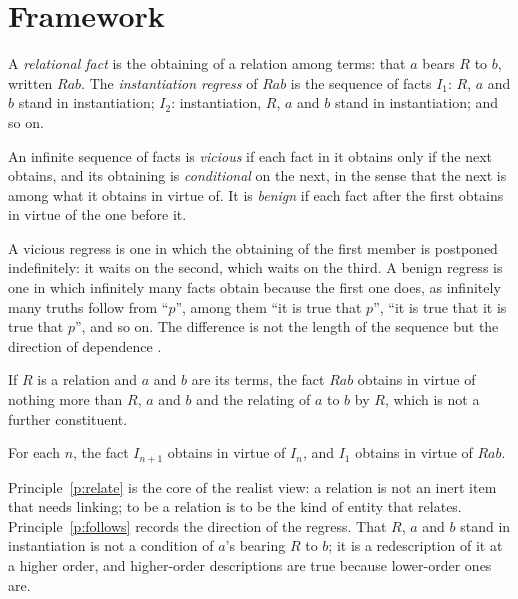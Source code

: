 \documentclass{situationist-preprint}
\begin{document}
\section{Framework}

\begin{definition}\label{d:fact}
A \emph{relational fact} is the obtaining of a relation among terms: that $a$ bears $R$ to $b$, written $Rab$. The \emph{instantiation regress} of $Rab$ is the sequence of facts $I_1$: $R$, $a$ and $b$ stand in instantiation; $I_2$: instantiation, $R$, $a$ and $b$ stand in instantiation; and so on.
\end{definition}

\begin{definition}\label{d:vicious}
An infinite sequence of facts is \emph{vicious} if each fact in it obtains only if the next obtains, and its obtaining is \emph{conditional} on the next, in the sense that the next is among what it obtains in virtue of. It is \emph{benign} if each fact after the first obtains in virtue of the one before it.
\end{definition}

A vicious regress is one in which the obtaining of the first member is postponed indefinitely: it waits on the second, which waits on the third. A benign regress is one in which infinitely many facts obtain because the first one does, as infinitely many truths follow from \enquote{$p$}, among them \enquote{it is true that $p$}, \enquote{it is true that it is true that $p$}, and so on. The difference is not the length of the sequence but the direction of dependence \citep{Cameron2008}.

\begin{principle}\label{p:relate}
If $R$ is a relation and $a$ and $b$ are its terms, the fact $Rab$ obtains in virtue of nothing more than $R$, $a$ and $b$ and the relating of $a$ to $b$ by $R$, which is not a further constituent.
\end{principle}

\begin{principle}\label{p:follows}
For each $n$, the fact $I_{n+1}$ obtains in virtue of $I_n$, and $I_1$ obtains in virtue of $Rab$.
\end{principle}

Principle~\ref{p:relate} is the core of the realist view: a relation is not an inert item that needs linking; to be a relation is to be the kind of entity that relates. Principle~\ref{p:follows} records the direction of the regress. That $R$, $a$ and $b$ stand in instantiation is not a condition of $a$'s bearing $R$ to $b$; it is a redescription of it at a higher order, and higher-order descriptions are true because lower-order ones are.
\end{document}
